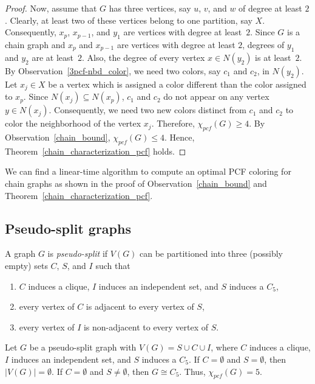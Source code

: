 \documentclass[11pt]{article}
\theoremstyle{plain}
\begin{document}
\begin{proof}
	\medskip
	
	Now, assume that $G$ has three vertices, say $u$, $v$, and $w$ of degree at least $2$. Clearly, at least two of these vertices belong to one partition, say $X$. Consequently, $x_p$, $x_{p-1}$, and $y_1$ are vertices with degree at least~$2$. 
	Since $G$ is a chain graph and $x_p$ and $x_{p-1}$ are vertices with degree at least $2$, degrees of $y_1$ and $y_2$ are at least~$2$. Also, the degree of every vertex $x\in N(y_2)$ is at least~$2$. By Observation~\ref{3pcf-nbd_color}, we need two colors, say $c_1$ and $c_2$, in $N(y_2)$. Let $x_j\in X$ be a vertex which is assigned a color different than the color assigned to $x_p$. Since $N(x_j)\subseteq N(x_p)$, $c_1$ and $c_2$ do not appear on any vertex $y\in N(x_j)$. Consequently, we need two new colors distinct from $c_1$ and $c_2$ to color the neighborhood of the vertex $x_j$. Therefore, $\chi_{pcf}(G) \geq 4$. By Observation~\ref{chain_bound}, $\chi_{pcf}(G) \leq 4$. 
	Hence, Theorem~\ref{chain_characterization_pcf} holds.    
\end{proof}

We can find a linear-time algorithm to compute an optimal PCF coloring for chain graphs as shown in the proof of Observation~\ref{chain_bound} and Theorem~\ref{chain_characterization_pcf}.

\subsection{Pseudo-split graphs}

A graph $G$ is \emph{pseudo-split} if $V(G)$ can be partitioned into three (possibly empty) sets $C$, $S$, and $I$ such that 
\begin{enumerate}
	\item $C$ induces a clique, $I$ induces an independent set, and $S$ induces a $C_5$,
	\item every vertex of $C$ is adjacent to every vertex of $S$,
	\item every vertex of $I$ is non-adjacent to every vertex of $S$.
\end{enumerate}

Let $G$ be a pseudo-split graph with $V(G) = S \cup C \cup I$, where $C$ induces a clique, $I$ induces an independent set, and $S$ induces a $C_5$. If $C=\emptyset$ and $S=\emptyset$, then $|V(G)| = \emptyset$. If $C=\emptyset$ and $S\neq\emptyset$, then $G\cong C_5$. Thus, $\chi_{pcf}(G) = 5$. 

\medskip
\end{document}

